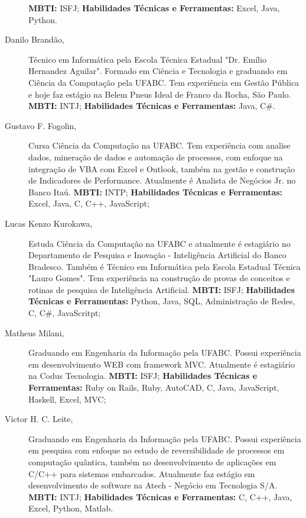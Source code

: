 \documentclass[12pt]{article}
\begin{document}
\begin{description}
\subitem \textbf{MBTI:} ISFJ;
\subitem \textbf{Habilidades Técnicas e Ferramentas:} Excel, Java, Python.
\newline
\item[Danilo Brandão,] \noindent Técnico em Informática pela Escola Técnica Estadual "Dr. Emílio Hernandez Aguilar". Formado em Ciência e Tecnologia e graduando em Ciência da Computação pela UFABC. Tem experiência em Gestão Pública e hoje faz estágio na Belem Pneus Ideal de Franco da Rocha, São Paulo.  
\subitem \textbf{MBTI:} INTJ;
\subitem \textbf{Habilidades Técnicas e Ferramentas:} Java, C\#.
\newline
\item[Gustavo F. Fogolin,]  Cursa Ciência da Computação na UFABC. Tem experiência com analise dados, mineração de dados e automação de processos, com enfoque na integração de VBA com Excel e Outlook, também na gestão e construção de Indicadores de Performance. Atualmente é Analista de Negócios Jr. no Banco Itaú. 
\subitem \textbf{MBTI:} INTP;
\subitem \textbf{Habilidades Técnicas e Ferramentas:} Excel, Java, C, C++, JavaScript;
\newline
\item[Lucas Kenzo Kurokawa,]  Estuda Ciência da Computação na UFABC e atualmente é estagiário no Departamento de Pesquisa e Inovação - Inteligência Artificial do Banco Bradesco. Também é Técnico em Informática pela Escola Estadual Técnica "Lauro Gomes". Tem experiência na construção de provas de conceitos e rotinas de pesquisa de Inteligência Artificial.  
\subitem \textbf{MBTI:} ISFJ;
\subitem \textbf{Habilidades Técnicas e Ferramentas:} Python, Java, SQL, Administração de Redes, C, C\#, JavaScritpt;
\\
\item[Matheus Milani,]  Graduando em Engenharia da Informação pela UFABC. Possui experiência em desenvolvimento WEB   com framework MVC. Atualmente é estagiário na Codus Tecnologia. 
\subitem \textbf{MBTI:} ISFJ;
\subitem \textbf{Habilidades Técnicas e Ferramentas:} Ruby on Rails, Ruby, AutoCAD, C, Java, JavaScript, Haskell, Excel, MVC;
\\ 
\item[Victor H. C. Leite,]  Graduando em Engenharia da Informação pela UFABC. Possui experiência em pesquisa com enfoque no estudo de reversibilidade de processos em computação quântica, também no desenvolvimento de aplicações em C/C++ para sistemas embarcados. Atualmente faz estágio em desenvolvimento de software na Atech - Negócio em Tecnologia S/A.
\subitem \textbf{MBTI:} INTJ;
\subitem \textbf{Habilidades Técnicas e Ferramentas:} C, C++, Java, Excel, Python, Matlab.
\end{description}
\end{document}
